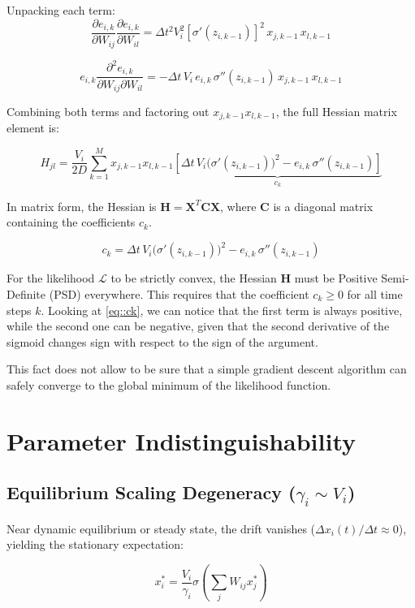 \documentclass[10pt, aps, rmp,  twocolumn, superscriptaddress, floatfix, showkeys]{revtex4-2}
\begin{document}
Unpacking each term:
    $$ \frac{\partial e_{i,k}}{\partial W_{ij}} \frac{\partial e_{i,k}}{\partial W_{il}} = \Delta t^2 V_i^2 [\sigma'(z_{i,k-1})]^2 \, x_{j, k-1} \, x_{l, k-1} $$
    
    $$ e_{i,k} \frac{\partial^2 e_{i,k}}{\partial W_{ij} \partial W_{il}} = - \Delta t \, V_i \, e_{i,k} \, \sigma''(z_{i,k-1}) \, x_{j, k-1} \, x_{l, k-1} $$

Combining both terms and factoring out 
$x_{j, k-1} x_{l, k-1}$, the full Hessian matrix element is:

$$ H_{jl} = \frac{V_i}{2D} \sum_{k=1}^M x_{j, k-1} x_{l, k-1} \underbrace{\left[ \Delta t \, V_i \big(\sigma'(z_{i,k-1})\big)^2 - e_{i,k} \, \sigma''(z_{i,k-1}) \right]}_{c_k} $$

In matrix form, the Hessian is $\mathbf{H} = \mathbf{X}^T \mathbf{C} \mathbf{X}$, where $\mathbf{C}$ is a diagonal matrix containing the coefficients $c_k$. 

\begin{equation}
    c_k = \Delta t \, V_i \big(\sigma'(z_{i,k-1})\big)^2 - e_{i,k} \, \sigma''(z_{i,k-1})
    \label{eq::ck}
\end{equation}

For the likelihood $\mathcal{L}$ to be strictly convex, the Hessian $\mathbf{H}$ must be Positive Semi-Definite (PSD) everywhere. This requires that the coefficient $c_k \ge 0$ for all time steps $k$.
Looking at \ref{eq::ck}, we can notice that the first term is always positive, while the second one can be negative, given that the second derivative of the sigmoid changes sign with respect to the sign of the argument.

This fact does not allow to be sure that a simple gradient descent algorithm can safely converge to the global minimum of the likelihood function. 

\section{Parameter Indistinguishability}

\subsection{Equilibrium Scaling Degeneracy ($\gamma_i \sim V_i$)}

Near dynamic equilibrium or steady state, the drift vanishes ($\Delta x_i(t) / \Delta t \approx 0$), yielding the stationary expectation:

$$x_i^* = \frac{V_i}{\gamma_i} \sigma\left( \sum_j W_{ij} x_j^* \right)$$
\end{document}
